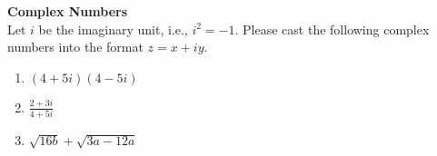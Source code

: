 {
\textbf{Complex Numbers}\\
Let $i$ be the imaginary unit, i.e., $i^2 = -1$.
Please cast the following complex numbers into the format $z=x + iy$.
\begin{enumerate}
	\item $(4+ 5i)(4 - 5i)$
	\item $\frac{2+3i}{4 + 5i}$
	\item $\sqrt{16b} + \sqrt{3a - 12a}$
\end{enumerate}
}